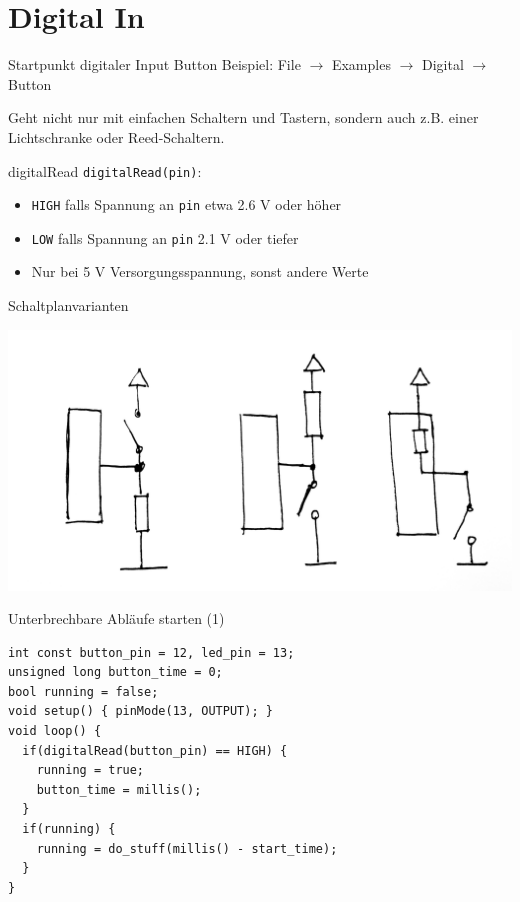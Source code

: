\documentclass[bigger]{beamer}
\begin{document}
\section{Digital In}
\label{sec:org64e69c6}
\begin{frame}[label={sec:org2f7b6c0}]{Startpunkt digitaler Input}
Button Beispiel: File \(\rightarrow\) Examples \(\rightarrow\) Digital
\(\rightarrow\) Button

Geht nicht nur mit einfachen Schaltern und Tastern, sondern auch
z.B. einer Lichtschranke oder Reed-Schaltern.
\end{frame}

\begin{frame}[fragile,label={sec:org6a45e99}]{digitalRead}
 \texttt{digitalRead(pin)}: 
\begin{itemize}
\item \texttt{HIGH} falls Spannung an \texttt{pin} etwa 2.6 V oder höher
\item \texttt{LOW} falls Spannung an \texttt{pin} 2.1 V oder tiefer
\item Nur bei 5 V Versorgungsspannung, sonst andere Werte
\end{itemize}
\end{frame}

\begin{frame}[label={sec:org541119a}]{Schaltplanvarianten}
\begin{center}
\includegraphics[width=.9\linewidth]{./img/pullup.jpg}
\end{center}
\end{frame}

\begin{frame}[fragile,label={sec:org0a8d8c2}]{Unterbrechbare Abläufe starten (1)}
 \begin{verbatim}
int const button_pin = 12, led_pin = 13;
unsigned long button_time = 0;
bool running = false;
void setup() { pinMode(13, OUTPUT); }
void loop() {
  if(digitalRead(button_pin) == HIGH) {
    running = true;
    button_time = millis();
  }
  if(running) {
    running = do_stuff(millis() - start_time);
  }
}
\end{verbatim}
\end{frame}
\end{document}
